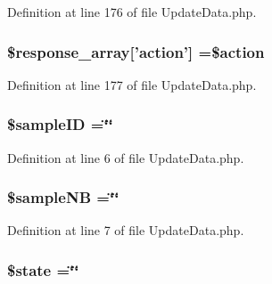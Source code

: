 Definition at line 176 of file Update\-Data.\-php.

\hypertarget{_update_data_8php_ae768978a0cdc416c0d63d798c85c8784}{
\subsubsection[{\$response\-\_\-array}]{\setlength{\rightskip}{0pt plus 5cm}\$response\-\_\-array\mbox{[}'action'\mbox{]} =\$action}}\label{_update_data_8php_ae768978a0cdc416c0d63d798c85c8784}


Definition at line 177 of file Update\-Data.\-php.

\hypertarget{_update_data_8php_a02ac215b001606467b9148c4cd0583f1}{
\subsubsection[{\$sample\-I\-D}]{\setlength{\rightskip}{0pt plus 5cm}\$sample\-I\-D =\char`\"{}\char`\"{}}}\label{_update_data_8php_a02ac215b001606467b9148c4cd0583f1}


Definition at line 6 of file Update\-Data.\-php.

\hypertarget{_update_data_8php_af4527e3b791f29528cf4587debf433df}{
\subsubsection[{\$sample\-N\-B}]{\setlength{\rightskip}{0pt plus 5cm}\$sample\-N\-B =\char`\"{}\char`\"{}}}\label{_update_data_8php_af4527e3b791f29528cf4587debf433df}


Definition at line 7 of file Update\-Data.\-php.

\hypertarget{_update_data_8php_ae82306c4f2d17d8dd5c7d8d916b33bed}{
\subsubsection[{\$state}]{\setlength{\rightskip}{0pt plus 5cm}\$state =\char`\"{}\char`\"{}}}\label{_update_data_8php_ae82306c4f2d17d8dd5c7d8d916b33bed}


